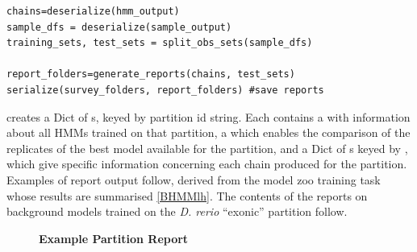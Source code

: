 \documentclass{ut-thesis}
\begin{document}
\begin{NoHyper}
\begin{verbatim}
chains=deserialize(hmm_output)
sample_dfs = deserialize(sample_output)
training_sets, test_sets = split_obs_sets(sample_dfs)

report_folders=generate_reports(chains, test_sets)
serialize(survey_folders, report_folders) #save reports
\end{verbatim}

 creates a Dict of s, keyed by partition id string. Each  contains a  with information about all HMMs trained on that partition, a  which enables the comparison of the replicates of the best model available for the partition, and a Dict of s keyed by , which give specific information concerning each chain produced for the partition. Examples of report output follow, derived from the model zoo training task whose results are summarised \autoref{BHMMlh}. The contents of the reports on background models trained on the \textit{D. rerio} ``exonic'' partition follow.

\begin{figure}[!h]
    \caption{{\bf Example \protect{} Partition Report}}
    \label{partreport}
\end{figure}


\end{NoHyper}
\end{document}

